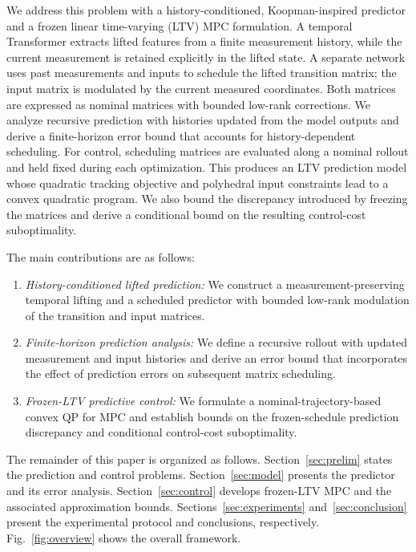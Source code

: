 \documentclass[journal]{IEEEtran}
\begin{document}
We address this problem with a history-conditioned, Koopman-inspired predictor and a frozen linear time-varying (LTV) MPC formulation. A temporal Transformer extracts lifted features from a finite measurement history, while the current measurement is retained explicitly in the lifted state. A separate network uses past measurements and inputs to schedule the lifted transition matrix; the input matrix is modulated by the current measured coordinates. Both matrices are expressed as nominal matrices with bounded low-rank corrections. We analyze recursive prediction with histories updated from the model outputs and derive a finite-horizon error bound that accounts for history-dependent scheduling. For control, scheduling matrices are evaluated along a nominal rollout and held fixed during each optimization. This produces an LTV prediction model whose quadratic tracking objective and polyhedral input constraints lead to a convex quadratic program. We also bound the discrepancy introduced by freezing the matrices and derive a conditional bound on the resulting control-cost suboptimality.

The main contributions are as follows:
\begin{enumerate}
    \item \emph{History-conditioned lifted prediction:} We construct a measurement-preserving temporal lifting and a scheduled predictor with bounded low-rank modulation of the transition and input matrices.
    \item \emph{Finite-horizon prediction analysis:} We define a recursive rollout with updated measurement and input histories and derive an error bound that incorporates the effect of prediction errors on subsequent matrix scheduling.
    \item \emph{Frozen-LTV predictive control:} We formulate a nominal-trajectory-based convex QP for MPC and establish bounds on the frozen-schedule prediction discrepancy and conditional control-cost suboptimality.
\end{enumerate}

The remainder of this paper is organized as follows. Section~\ref{sec:prelim} states the prediction and control problems. Section~\ref{sec:model} presents the predictor and its error analysis. Section~\ref{sec:control} develops frozen-LTV MPC and the associated approximation bounds. Sections~\ref{sec:experiments} and~\ref{sec:conclusion} present the experimental protocol and conclusions, respectively. Fig.~\ref{fig:overview} shows the overall framework.
\end{document}
